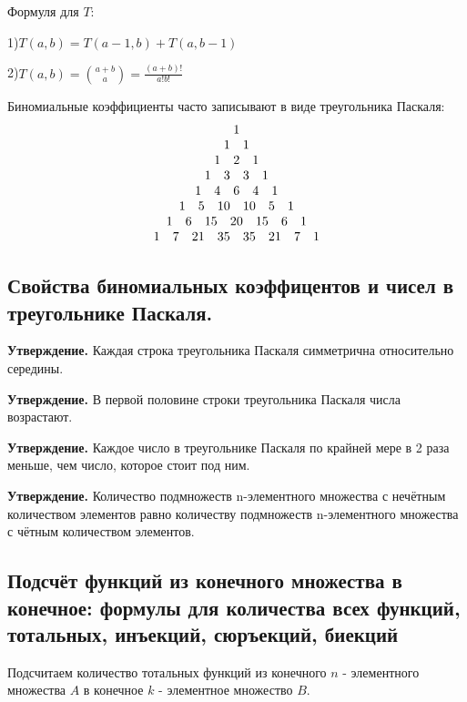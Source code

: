\documentclass[a4paper, 10pt]{article}
\begin{document}
\medskip

Формуля для $T$:

1)$T(a, b) = T(a - 1, b) + T(a, b - 1)$

2)$T(a, b) = \binom{a + b}{a} = \frac{(a+b)!}{a!b!}$

\medskip

Биномиальные коэффициенты часто записывают в виде треугольника Паскаля: \\

$${\centering \begin{array}{c}
	1 \\
	1 \quad 1 \\
	1 \quad 2 \quad 1 \\
	1 \quad 3 \quad 3 \quad 1 \\
	1 \quad 4 \quad 6 \quad 4 \quad 1 \\
	1 \quad 5 \quad 10 \quad 10 \quad 5 \quad 1 \\
	1 \quad 6 \quad 15 \quad 20 \quad 15 \quad 6 \quad 1 \\
	1 \quad 7 \quad 21 \quad 35 \quad 35 \quad 21 \quad 7 \quad 1 \\
\end{array}}$$

\subsection{Свойства биномиальных коэффицентов и чисел в треугольнике Паскаля.}

\textbf{Утверждение.} Каждая строка треугольника Паскаля симметрична относительно середины.

\textbf{Утверждение.} В первой половине строки треугольника Паскаля числа возрастают.

\textbf{Утверждение.} Каждое число в треугольнике Паскаля по крайней мере в 2 раза меньше, чем число, которое стоит под ним.

\textbf{Утверждение.} Количество подмножеств n-элементного множества с нечётным количеством элементов равно количеству подмножеств n-элементного множества с чётным количеством элементов.
\subsection{Подсчёт функций из конечного множества в конечное: формулы для количества всех функций, тотальных, инъекций, сюръекций, биекций}

Подсчитаем количество тотальных функций из конечного $n$ - элементного множества $A$ в конечное $k$ - элементное множество $B$.
\end{document}
